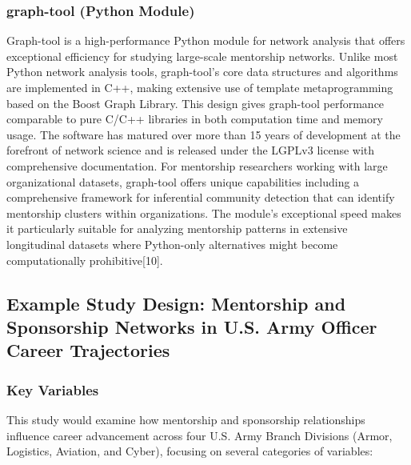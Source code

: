 \documentclass[
  letterpaper,
  DIV=11,
  numbers=noendperiod]{scrartcl}
\begin{document}
\subsubsection{graph-tool (Python
Module)}\label{graph-tool-python-module}

Graph-tool is a high-performance Python module for network analysis that
offers exceptional efficiency for studying large-scale mentorship
networks. Unlike most Python network analysis tools, graph-tool's core
data structures and algorithms are implemented in C++, making extensive
use of template metaprogramming based on the Boost Graph Library. This
design gives graph-tool performance comparable to pure C/C++ libraries
in both computation time and memory usage. The software has matured over
more than 15 years of development at the forefront of network science
and is released under the LGPLv3 license with comprehensive
documentation. For mentorship researchers working with large
organizational datasets, graph-tool offers unique capabilities including
a comprehensive framework for inferential community detection that can
identify mentorship clusters within organizations. The module's
exceptional speed makes it particularly suitable for analyzing
mentorship patterns in extensive longitudinal datasets where Python-only
alternatives might become computationally prohibitive{[}10{]}.

\subsection{Example Study Design: Mentorship and Sponsorship Networks in
U.S. Army Officer Career
Trajectories}\label{example-study-design-mentorship-and-sponsorship-networks-in-u.s.-army-officer-career-trajectories}

\subsubsection{Key Variables}\label{key-variables}

This study would examine how mentorship and sponsorship relationships
influence career advancement across four U.S. Army Branch Divisions
(Armor, Logistics, Aviation, and Cyber), focusing on several categories
of variables:
\end{document}
